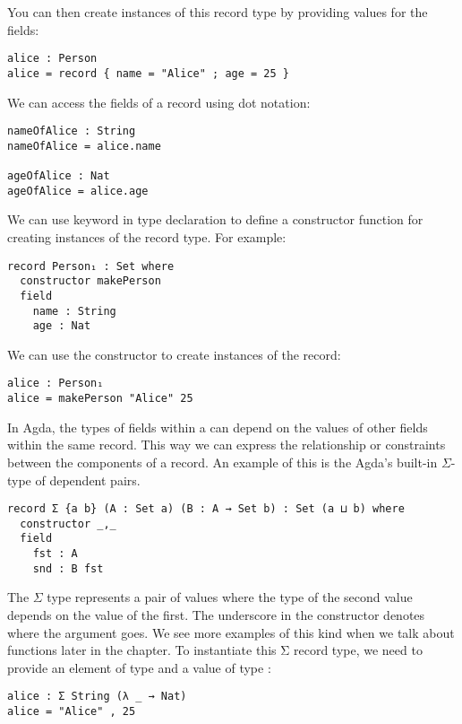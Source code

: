 You can then create instances of this record type by providing values for the
fields:

\begin{verbatim}
alice : Person
alice = record { name = "Alice" ; age = 25 }
\end{verbatim}

We can access the fields of a record using dot notation:
\begin{verbatim}
nameOfAlice : String
nameOfAlice = alice.name

ageOfAlice : Nat
ageOfAlice = alice.age
\end{verbatim}

We can use  keyword in  type declaration to
define a constructor function for creating instances of the record type. For
example:

\begin{verbatim}
record Person₁ : Set where
  constructor makePerson
  field
    name : String
    age : Nat
\end{verbatim}

We can use the constructor  to create instances of the 
record:

\begin{verbatim}
alice : Person₁
alice = makePerson "Alice" 25
\end{verbatim}

In Agda, the types of fields within a  can depend on the values
of other fields within the same record. This way we can express the relationship
or constraints between the components of a record. An example of this is the
Agda's built-in $\Sigma$-type of dependent pairs.

\begin{verbatim}
record Σ {a b} (A : Set a) (B : A → Set b) : Set (a ⊔ b) where
  constructor _,_
  field
    fst : A
    snd : B fst
\end{verbatim}

The $\Sigma$ type represents a pair of values where the type of the second value
depends on the value of the first. The underscore in the constructor denotes
where the argument goes. We see more examples of this kind when we talk about
functions later in the chapter. To instantiate this Σ record type, we need to
provide an element of type  and a value of type :

\begin{verbatim}
alice : Σ String (λ _ → Nat)
alice = "Alice" , 25
\end{verbatim}

